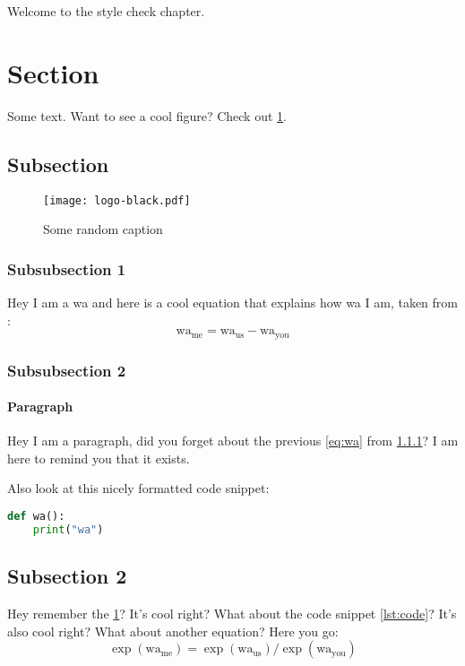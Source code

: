 Welcome to the style check chapter.
\section{Section}
Some text. Want to see a cool figure? Check out \cref{fig:my_label}.
\subsection{Subsection}
\begin{figure}[H]
    \centering
    \texttt{[image: logo-black.pdf]}
    \caption{Some random caption}
    \label{fig:my_label}
\end{figure}

\subsubsection{Subsubsection 1}\label{subsubsec:subsubsection1}
Hey I am a wa and here is a cool equation that explains how wa I am, taken from \cite{ams_coarse_space_comp_study_Alves2024}:
\begin{equation}
    \text{wa}_{\text{me}} = \text{wa}_{\text{us}} - \text{wa}_{\text{you}}
    \label{eq:wa}
\end{equation}

\subsubsection{Subsubsection 2}
\paragraph{Paragraph}
Hey I am a paragraph, did you forget about the previous \cref{eq:wa} from \cref{subsubsec:subsubsection1}? I am here to remind you that it exists.

Also look at this nicely formatted code snippet:
\begin{lstlisting}[language=Python,caption={Python Code Snippet},label={lst:code}]
def wa():
    print("wa")

\end{lstlisting}

\subsection{Subsection 2}
Hey remember the \cref{fig:my_label}? It's cool right? What about the code snippet \ref{lst:code}? It's also cool right? What about another equation? Here you go:
\begin{equation}
    \exp(\text{wa}_{\text{me}}) = \exp(\text{wa}_{\text{us}}) / \exp(\text{wa}_{\text{you}})
    \label{eq:wa2}
\end{equation}